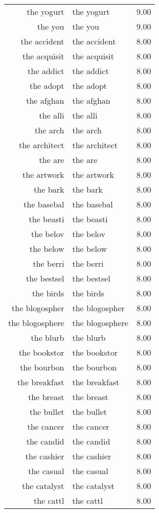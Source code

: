 \begin{table}[ht]
\begin{tabular}{rlr}
  the yogurt & the yogurt & 9.00 \\ 
  the you & the you & 9.00 \\ 
  the accident & the accident & 8.00 \\ 
  the acquisit & the acquisit & 8.00 \\ 
  the addict & the addict & 8.00 \\ 
  the adopt & the adopt & 8.00 \\ 
  the afghan & the afghan & 8.00 \\ 
  the alli & the alli & 8.00 \\ 
  the arch & the arch & 8.00 \\ 
  the architect & the architect & 8.00 \\ 
  the are & the are & 8.00 \\ 
  the artwork & the artwork & 8.00 \\ 
  the bark & the bark & 8.00 \\ 
  the basebal & the basebal & 8.00 \\ 
  the beasti & the beasti & 8.00 \\ 
  the belov & the belov & 8.00 \\ 
  the below & the below & 8.00 \\ 
  the berri & the berri & 8.00 \\ 
  the bestsel & the bestsel & 8.00 \\ 
  the birds & the birds & 8.00 \\ 
  the blogospher & the blogospher & 8.00 \\ 
  the blogosphere & the blogosphere & 8.00 \\ 
  the blurb & the blurb & 8.00 \\ 
  the bookstor & the bookstor & 8.00 \\ 
  the bourbon & the bourbon & 8.00 \\ 
  the breakfast & the breakfast & 8.00 \\ 
  the breast & the breast & 8.00 \\ 
  the bullet & the bullet & 8.00 \\ 
  the cancer & the cancer & 8.00 \\ 
  the candid & the candid & 8.00 \\ 
  the cashier & the cashier & 8.00 \\ 
  the casual & the casual & 8.00 \\ 
  the catalyst & the catalyst & 8.00 \\ 
  the cattl & the cattl & 8.00 \\ 

\end{tabular}
\end{table}

